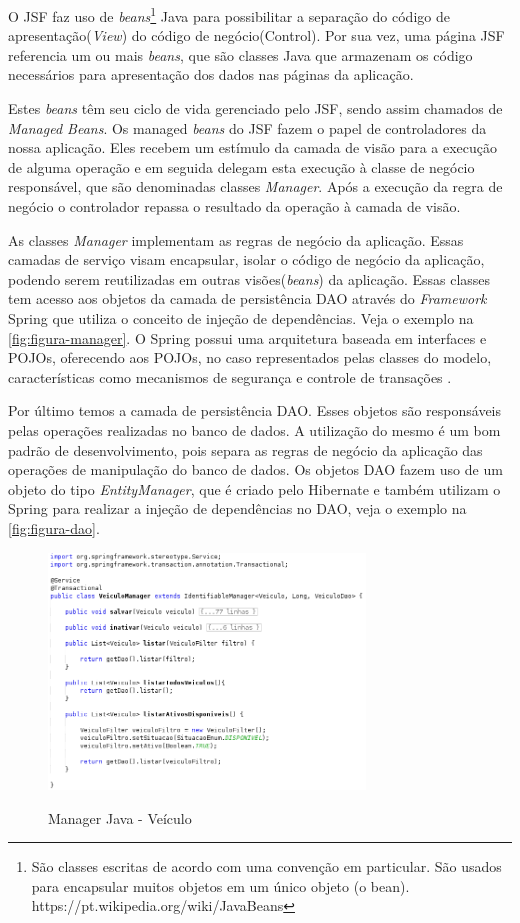 O JSF faz uso de \textit{beans}\footnote{São classes escritas de acordo com uma convenção em particular. São usados para encapsular muitos objetos em um único objeto (o bean). https://pt.wikipedia.org/wiki/JavaBeans} Java para possibilitar a separação do código de apresentação(\textit{View}) do código de negócio(Control). Por sua vez, uma página JSF referencia um ou mais \textit{beans}, que são classes Java que armazenam os código necessários para apresentação dos dados nas páginas da aplicação. 

Estes \textit{beans} têm seu ciclo de vida gerenciado pelo JSF, sendo assim chamados de \textit{Managed Beans}.
Os managed \textit{beans} do JSF fazem o papel de controladores da nossa aplicação. Eles recebem um estímulo da camada de visão para a execução de alguma operação e em seguida delegam esta execução à classe de negócio responsável, que são denominadas classes \textit{Manager}. Após a execução da regra de negócio o controlador repassa o resultado da operação à camada de visão.

As classes \textit{Manager} implementam as regras de negócio da aplicação. Essas camadas de serviço visam encapsular, isolar o código de negócio da aplicação, podendo serem reutilizadas em outras visões(\textit{beans}) da aplicação. Essas classes tem acesso aos objetos da camada de persistência DAO através do \textit{Framework} Spring que utiliza o conceito de injeção de dependências. Veja o exemplo na \autoref{fig:figura-manager}. 
O Spring possui uma arquitetura baseada em interfaces e POJOs, oferecendo aos POJOs, no caso representados pelas classes do modelo, características como mecanismos de segurança e controle de transações \cite{WikipediaSpring2017}. 

Por último temos a camada de persistência DAO. Esses objetos são responsáveis pelas operações realizadas no banco de dados. A utilização do mesmo é um bom padrão de desenvolvimento, pois separa as regras de negócio da aplicação das operações de manipulação do banco de dados. Os objetos DAO fazem uso de um objeto do tipo \textit{EntityManager}, que é criado pelo Hibernate e também utilizam o Spring para realizar a injeção de dependências no DAO, veja o exemplo na \autoref{fig:figura-dao}. 

\begin{figure}[!htb]
    \centering
    \caption{Manager Java - Veículo}
    \includegraphics[width=0.75\textwidth]{dados/figuras/manager.png}
    \label{fig:figura-manager}
\end{figure}

